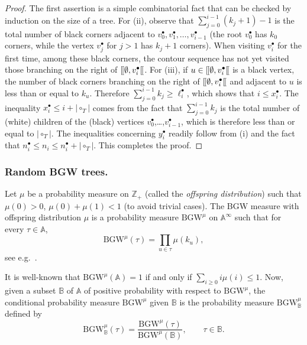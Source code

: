 \documentclass[10pt]{amsart}
\theoremstyle{definition}\newtheorem{defi}[theo]{Definition}\newtheorem{rema}[theo]{Remark}\newtheorem{exam}[theo]{Example}\newtheorem{exem}[theo]{Example}\newtheorem{nota}[theo]{Notation}
\providecommand{\abs}[1]{\lvert#1\rvert}
\newcommand{\Z}{\mathbb{Z}}
\newcommand\BGW{\textrm{BGW}}
\def\llbracket{[\hspace{-.10em} [ }
\begin{document}
\begin{proof} The first assertion is a simple combinatorial fact that can be checked by induction on the size of a tree.
  For (ii),  observe that $\sum_{j=0}^{i-1}(k_{j}+1)-1$ is the total number of black corners adjacent to $v^{\bullet}_{0}, v^{\bullet}_{1}, \ldots, v^{\bullet}_{i-1}$ (the root $v^{\bullet}_0$ has $k_0$ corners, while the vertex $v^{\bullet}_j$ for $j>1$ has $k_j+1$ corners).
  When visiting $v^{\bullet}_{i}$ for the first time, among these black corners, the contour sequence has not yet visited those branching on the right of  $\llbracket \emptyset, v^{\bullet}_{i} \llbracket$. For (iii), if $u \in  \llbracket \emptyset, v^{\bullet}_{i} \llbracket$ is a black vertex,  the number of black corners  branching on the right of $\llbracket \emptyset, v^{\bullet}_{i} \llbracket$ and adjacent to $u$ is less than or equal to $k_{u}$. Therefore $\sum_{j=0}^{i-1} k_{j} \geq  \ell_{i}^{\bullet}$, which shows that $i \leq x^{\bullet}_{i}$. The inequality $x^{\bullet}_{i} \leq i+ \abs{\circ_{T}}$ comes from the fact that $\sum_{j=0}^{i-1} k_{j}$  is the total number of (white) children of the  (black) vertices $v^{\bullet}_0$,\dots,$v^{\bullet}_{i-1}$, which is therefore less than or equal to $ \abs{\circ_{T}}$. The inequalities concerning $y^{\bullet}_{i}$ readily follow from (i) and the fact that $ n^{\bullet}_{i} \leq n_{i} \leq n_{i}^{\bullet}+\abs{\circ_{T}}$. This completes the proof.
    \end{proof}


\subsubsection{Random BGW trees.} Let $\mu$ be a  probability measure on $\Z_+$ (called the \emph{offspring distribution}) such that $\mu(0) > 0$, $\mu(0)+\mu(1)<1$ (to avoid trivial cases). The {\BGW} measure with offspring distribution $\mu$ is a probability measure $\mathrm{BGW}^\mu$ on $\mathbb{A}^{\infty}$ such that  for every $\tau \in \mathbb{A}$,
\begin{equation}\label{eq:def_GW}
\mathrm{BGW}^\mu(\tau) = \prod_{u \in \tau} \mu(k_u),
\end{equation}
see e.g.~\cite[Prop.~1.4]{LG05}.

It is well-known that $\mathrm{BGW}^\mu(\mathbb{A})=1$ if and only if $\sum_{i \geq 0} i \mu (i) \leq 1$.
Now, given a subset $\mathbb{B}$ of $\mathbb A$ of positive probability with respect to  $\mathrm{BGW}^\mu$,
 the conditional probability measure  $\mathrm{BGW}^\mu$  given $\mathbb{B}$ is the probability measure $\mathrm{BGW}^\mu_{\mathbb B}$
defined by
\[ \mathrm{BGW}^\mu_{\mathbb B}(\tau)= \frac{\mathrm{BGW}^\mu( \tau)}{\mathrm{BGW}^\mu(\mathbb{B})},
\qquad \tau \in \mathbb{B}.\]
\end{document}
